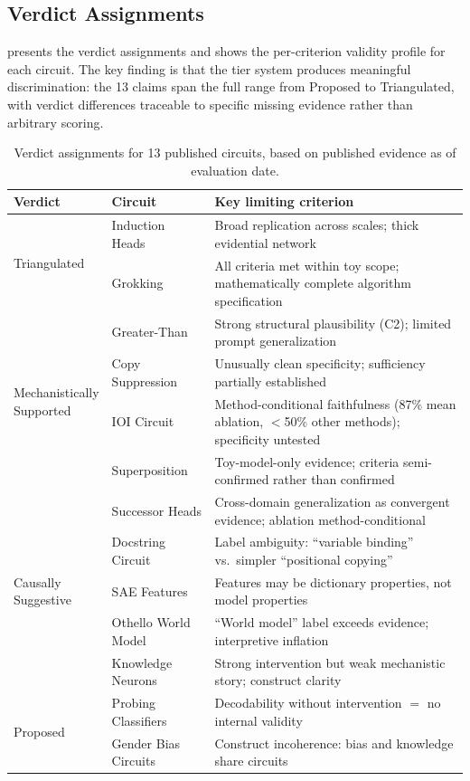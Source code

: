 \documentclass[10pt]{article}
\newcommand{\tighttable}{\setlength{\tabcolsep}{4pt}\renewcommand{\arraystretch}{1.05}}
\begin{document}
\subsection{Verdict Assignments}

 presents the verdict assignments and  shows the per-criterion validity profile for each circuit. The key finding is that the tier system produces meaningful discrimination: the 13 claims span the full range from Proposed to Triangulated, with verdict differences traceable to specific missing evidence rather than arbitrary scoring.

\begin{table}[t]
\centering
\tighttable
\caption{Verdict assignments for 13 published circuits, based on published evidence as of evaluation date.}
\label{tab:case-studies}
\small
\begin{tabular}{@{}llp{6.5cm}@{}}
\toprule
\textbf{Verdict} & \textbf{Circuit} & \textbf{Key limiting criterion} \\
\midrule
\multirow{2}{*}{Triangulated} & Induction Heads & Broad replication across scales; thick evidential network \\
& Grokking & All criteria met within toy scope; mathematically complete algorithm specification \\
\midrule
\multirow{4}{*}{\parbox{2.3cm}{Mechanistically\\Supported}} & Greater-Than & Strong structural plausibility (C2); limited prompt generalization \\
& Copy Suppression & Unusually clean specificity; sufficiency partially established \\
& IOI Circuit & Method-conditional faithfulness (87\% mean ablation, $<$50\% other methods); specificity untested \\
& Superposition & Toy-model-only evidence; criteria semi-confirmed rather than confirmed \\
\midrule
\multirow{5}{*}{\parbox{2.3cm}{Causally\\Suggestive}} & Successor Heads & Cross-domain generalization as convergent evidence; ablation method-conditional \\
& Docstring Circuit & Label ambiguity: ``variable binding'' vs.\ simpler ``positional copying'' \\
& SAE Features & Features may be dictionary properties, not model properties \\
& Othello World Model & ``World model'' label exceeds evidence; interpretive inflation \\
& Knowledge Neurons & Strong intervention but weak mechanistic story; construct clarity \\
\midrule
\multirow{2}{*}{Proposed} & Probing Classifiers & Decodability without intervention $=$ no internal validity \\
& Gender Bias Circuits & Construct incoherence: bias and knowledge share circuits \\
\bottomrule
\end{tabular}
\end{table}
\end{document}
